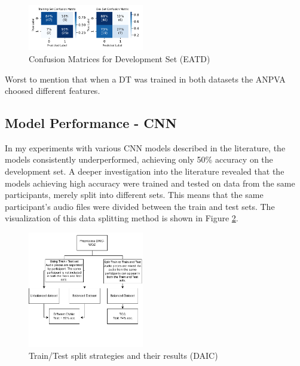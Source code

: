 \begin{figure}[H]
\centering
\includegraphics[width=0.45\textwidth]{vis_pdf/eatd_all_confusion_matrices.pdf} %
\caption{Confusion Matrices for Development Set (EATD)}
\label{fig:confusion_matrices_eatd}
\end{figure}

Worst to mention that when a DT was trained in both datasets the ANPVA choosed different features. 

\subsection{Model Performance - CNN}

In my experiments with various CNN models described in the literature, the models consistently underperformed, achieving only 50\% accuracy on the development set. A deeper investigation into the literature revealed that the models achieving high accuracy were trained and tested on data from the same participants, merely split into different sets. This means that the same participant's audio files were divided between the train and test sets. The visualization of this data splitting method is shown in Figure \ref{fig:train_test_split_problems}.

\begin{figure}[H]
    \centering
    \includegraphics[width=0.45\textwidth]{vis_pdf/Train Test problem.drawio.pdf}
    \caption{Train/Test split strategies and their results (DAIC)}
    \label{fig:train_test_split_problems}
\end{figure}

